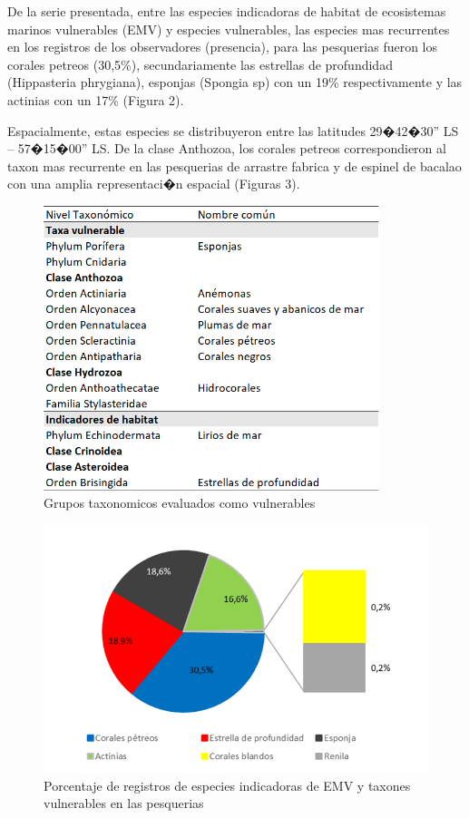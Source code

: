 \documentclass[
  super,
  preprint,
  3p]{elsarticle}
\begin{document}
De la serie presentada, entre las especies indicadoras de habitat de
ecosistemas marinos vulnerables (EMV) y especies vulnerables, las
especies mas recurrentes en los registros de los observadores
(presencia), para las pesquerias fueron los corales petreos (30,5\%),
secundariamente las estrellas de profundidad (Hippasteria phrygiana),
esponjas (Spongia sp) con un 19\% respectivamente y las actinias con un
17\% (Figura 2).

Espacialmente, estas especies se distribuyeron entre las latitudes
29�42�30'' LS -- 57�15�00'' LS. De la clase Anthozoa, los corales
petreos correspondieron al taxon mas recurrente en las pesquerias de
arrastre fabrica y de espinel de bacalao con una amplia representaci�n
espacial (Figuras 3).

\begin{figure}

{\centering \includegraphics[width=3.85417in,height=\textheight]{especies.png}

}

\caption{Grupos taxonomicos evaluados como vulnerables}

\end{figure}

\begin{figure}

{\centering \includegraphics{grafico-pie.png}

}

\caption{Porcentaje de registros de especies indicadoras de EMV y
taxones vulnerables en las pesquerias}

\end{figure}
\end{document}
